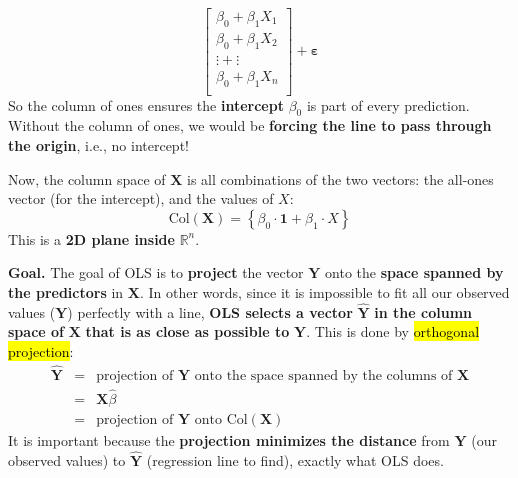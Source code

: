 \begin{itemize}
\begin{equation*}
        \begin{bmatrix}
            \beta_0 + \beta_1 X_1 \\
            \beta_0 + \beta_1 X_2 \\
            \vdots + \vdots \\
            \beta_0 + \beta_1 X_n \\
        \end{bmatrix} + \boldsymbol{\varepsilon}
    \end{equation*}
    So the column of ones ensures the \textbf{intercept} $\beta_0$ is part of every prediction. Without the column of ones, we would be \textbf{forcing the line to pass through the origin}, i.e., no intercept!
\end{itemize}
Now, the column space of $\mathbf{X}$ is all combinations of the two vectors: the all-ones vector (for the intercept), and the values of $X$:
\begin{equation*}
    \text{Col}\left(\mathbf{X}\right) = \left\{\beta_0 \cdot \mathbf{1} + \beta_1 \cdot X\right\}
\end{equation*}
This is a \textbf{2D plane inside} $\mathbb{R}^{n}$.

\highspace
\textcolor{Red2}{ \textbf{Goal.}} The goal of OLS is to \textbf{project} the vector $\mathbf{Y}$ onto the \textbf{space spanned by the predictors} in $\mathbf{X}$. In other words, since it is impossible to fit all our observed values ($\mathbf{Y}$) perfectly with a line, \textbf{OLS selects a vector} $\hat{\mathbf{Y}}$ \textbf{in the column space of} $\mathbf{X}$ \textbf{that is as close as possible to} $\mathbf{Y}$. This is done by \hl{orthogonal projection}:
\begin{equation*}
    \begin{array}{rcl}
        \hat{\mathbf{Y}} &=& \text{projection of } \mathbf{Y} \text{ onto the space spanned by the columns of } \mathbf{X} \\ [.3em]
        &=& \mathbf{X}\hat{\beta} \\ [.3em]
        &=& \text{projection of } \mathbf{Y} \text{ onto Col}\left(\mathbf{X}\right)
    \end{array}
\end{equation*}
It is important because the \textbf{projection minimizes the distance} from $\mathbf{Y}$ (our observed values) to $\hat{\mathbf{Y}}$ (regression line to find), exactly what OLS does.

\newpage

